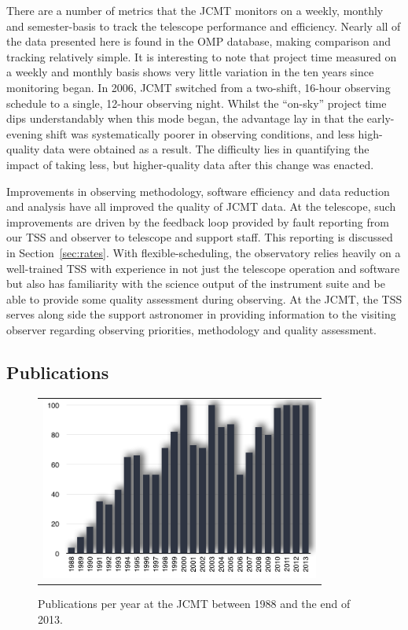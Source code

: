 \documentclass[]{spie}  %
\begin{document}
There are a number of metrics that the JCMT monitors on a weekly,
monthly and semester-basis to track the telescope performance and
efficiency. Nearly all of the data presented here is found in the OMP
database, making comparison and tracking relatively simple. It is
interesting to note that project time measured on a weekly and monthly
basis shows very little variation in the ten years since monitoring
began. In 2006, JCMT switched from a two-shift, 16-hour observing
schedule to a single, 12-hour observing night. Whilst the ``on-sky''
project time dips understandably when this mode began, the advantage
lay in that the early-evening shift was systematically poorer in
observing conditions, and less high-quality data were obtained as a
result. The difficulty lies in quantifying the impact of taking less,
but higher-quality data after this change was enacted.

Improvements in observing methodology, software efficiency and data
reduction and analysis have all improved the quality of JCMT data. At
the telescope, such improvements are driven by the feedback loop
provided by fault reporting from our TSS and observer to telescope and
support staff. This reporting is discussed in
Section~\ref{sec:rates}. With flexible-scheduling, the observatory
relies heavily on a well-trained TSS with experience in not just the
telescope operation and software but also has familiarity with the
science output of the instrument suite and be able to provide some
quality assessment during observing. At the JCMT, the TSS serves along
side the support astronomer in providing information to the visiting
observer regarding observing priorities, methodology and quality
assessment.

\subsection{Publications}
 \begin{figure}[ht]
   \begin{center}
   \begin{tabular}{c}
   \includegraphics[height=6cm]{jcmt_publications}
   \end{tabular}
   \end{center}
   \caption{\label{fig:pub} Publications per year at the JCMT between 1988 and the end of 2013.}
\end{figure}
\end{document}
